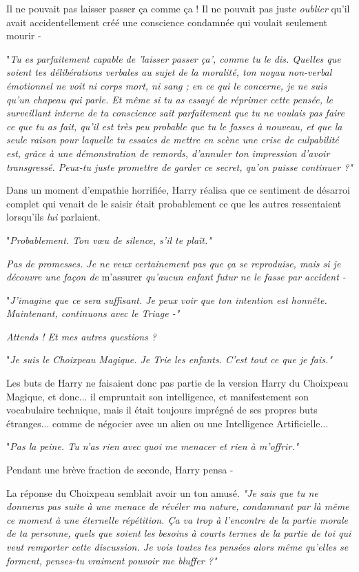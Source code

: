 Il ne pouvait pas laisser passer ça comme ça ! Il ne pouvait pas juste \emph{oublier}  qu'il avait accidentellement créé une conscience condamnée qui voulait seulement mourir -

"\emph{Tu es parfaitement capable de 'laisser passer ça', comme tu le dis. Quelles que soient tes délibérations verbales au sujet de la moralité, ton noyau non-verbal émotionnel ne voit ni corps mort, ni sang ; en ce qui le concerne, je ne suis qu'un chapeau qui parle. Et même si tu as essayé de réprimer cette pensée, le surveillant interne de ta conscience sait parfaitement que tu ne voulais pas faire ce que tu as fait, qu'il est très peu probable que tu le fasses à nouveau, et que la seule raison pour laquelle tu essaies de mettre en scène une crise de culpabilité est, grâce à une démonstration de remords, d'annuler ton impression d'avoir transgressé. Peux-tu juste promettre de garder ce secret, qu'on puisse continuer ?"} 

Dans un moment d'empathie horrifiée, Harry réalisa que ce sentiment de désarroi complet qui venait de le saisir était probablement ce que les autres ressentaient lorsqu'ils \emph{lui}  parlaient.

"\emph{Probablement. Ton vœu de silence, s'il te plaît."} 

\emph{Pas de promesses. Je ne veux certainement pas que ça se reproduise, mais si je découvre une façon de } m'assurer\emph{ qu'aucun enfant futur ne le fasse par accident -} 

"\emph{J'imagine que ce sera suffisant. Je peux voir que ton intention est honnête. Maintenant, continuons avec le Triage -"} 

\emph{Attends ! Et mes autres questions ?} 

"\emph{Je suis le Choixpeau Magique. Je Trie les enfants. C'est tout ce que je fais."} 

Les buts de Harry ne faisaient donc pas partie de la version Harry du Choixpeau Magique, et donc... il empruntait son intelligence, et manifestement son vocabulaire technique, mais il était toujours imprégné de ses propres buts étranges... comme de négocier avec un alien ou une Intelligence Artificielle...

"\emph{Pas la peine. Tu n'as rien avec quoi me menacer et rien à m'offrir."} 

Pendant une brève fraction de seconde, Harry pensa -

La réponse du Choixpeau semblait avoir un ton amusé. \emph{"Je sais que tu ne donneras pas suite à une menace de révéler ma nature, condamnant par là même ce moment à une éternelle répétition. Ça va trop à l'encontre de la partie morale de ta personne, quels que soient les besoins à courts termes de la partie de toi qui veut remporter cette discussion. Je vois toutes tes pensées alors même qu'elles se forment, penses-tu vraiment pouvoir me bluffer ?"} 

